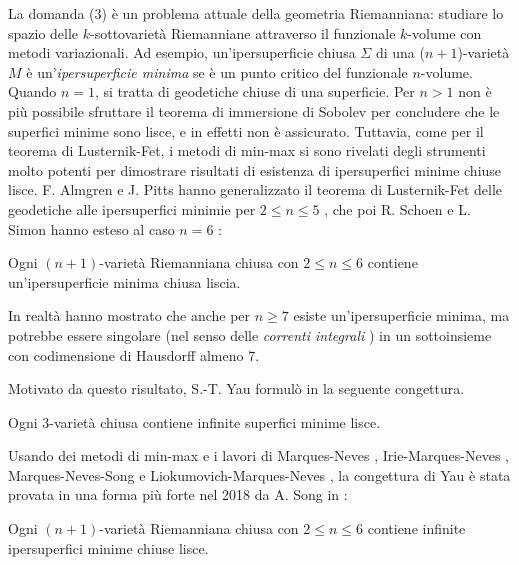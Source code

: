 La domanda (3) è un problema attuale della geometria Riemanniana: studiare lo spazio delle \(k\)-sottovarietà Riemanniane attraverso il funzionale \(k\)-volume con metodi variazionali. Ad esempio, un'ipersuperficie chiusa \(\Sigma\) di una (\(n+1\))-varietà \(M\) è un'\textit{ipersuperficie minima} se è un punto critico del funzionale \(n\)-volume. Quando \(n=1\), si tratta di geodetiche chiuse di una superficie. Per \(n>1\) non è più possibile sfruttare il teorema di immersione di Sobolev per concludere che le superfici minime sono lisce, e in effetti non è assicurato. Tuttavia, come per il teorema di Lusternik-Fet, i metodi di min-max si sono rivelati degli strumenti molto potenti per dimostrare risultati di esistenza di ipersuperfici minime chiuse lisce. F. Almgren e J. Pitts hanno generalizzato il teorema di Lusternik-Fet delle geodetiche alle ipersuperfici minimie per \(2 \leq n \leq 5\) \cite{pitts1981existence}, che poi R. Schoen e L. Simon hanno esteso al caso \(n=6\) \cite{schoen1981regularity}:
\begin{teo}
	Ogni \((n+1)\)-varietà Riemanniana chiusa con \(2 \leq n \leq 6\) contiene un'ipersuperficie minima chiusa liscia. 
\end{teo}
In realtà hanno mostrato che anche per \(n \geq 7\) esiste un'ipersuperficie minima, ma potrebbe essere singolare (nel senso delle \textit{correnti integrali} \cite{delellis2015size}) in un sottoinsieme con codimensione di Hausdorff almeno 7.

Motivato da questo risultato, S.-T. Yau formulò in \cite{yau1981seminar} la seguente congettura.
\begin{conget}[Yau, 1981]
	Ogni 3-varietà chiusa contiene infinite superfici minime lisce. 
\end{conget}
Usando dei metodi di min-max e i lavori di Marques-Neves \cite{marques2013existence} \cite{marques2016morseindexmultiplicityminmax} \cite{marques2019morseindexmultiplicityminmax}, Irie-Marques-Neves \cite{irie2018densityminimalhypersurfacesgeneric}, Marques-Neves-Song \cite{marques2018equidistributionminimalhypersurfacesgeneric} e Liokumovich-Marques-Neves \cite{liokumovich2018weyllawvolumespectrum}, la congettura di Yau è stata provata in una forma più forte nel 2018 da A. Song in \cite{song2023existence}:
\begin{teo}[Song, 2018]
	Ogni \((n+1)\)-varietà Riemanniana chiusa con \(2 \leq n\leq 6\) contiene infinite ipersuperfici minime chiuse lisce. 
\end{teo}




